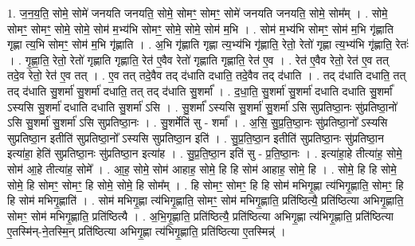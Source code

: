 \documentclass[17pt]{extarticle}
\begin{document}
1. ज॒न॒य॒ति॒ सोमे॒ सोमे॑ जनयति जनयति॒ सोमे॒ सोमꣳ॒॒ सोमꣳ॒॒ सोमे॑ जनयति जनयति॒ सोमे॒ सोम᳚म् । . सोमे॒ सोमꣳ॒॒ सोमꣳ॒॒ सोमे॒ सोमे॒ सोम॑ म॒भ्य॑भि सोमꣳ॒॒ सोमे॒ सोमे॒ सोम॑ म॒भि । . सोम॑ म॒भ्य॑भि सोमꣳ॒॒ सोम॑ म॒भि गृ॑ह्णाति गृह्णा त्य॒भि सोमꣳ॒॒ सोम॑ म॒भि गृ॑ह्णाति । . अ॒भि गृ॑ह्णाति गृह्णा त्य॒भ्य॑भि गृ॑ह्णाति॒ रेतो॒ रेतो॑ गृह्णा त्य॒भ्य॑भि गृ॑ह्णाति॒ रेतः॑ । . गृ॒ह्णा॒ति॒ रेतो॒ रेतो॑ गृह्णाति गृह्णाति॒ रेत॑ ए॒वैव रेतो॑ गृह्णाति गृह्णाति॒ रेत॑ ए॒व । . रेत॑ ए॒वैव रेतो॒ रेत॑ ए॒व तत् तदे॒व रेतो॒ रेत॑ ए॒व तत् । . ए॒व तत् तदे॒वैव तद् द॑धाति दधाति॒ तदे॒वैव तद् द॑धाति । . तद् द॑धाति दधाति॒ तत् तद् द॑धाति सु॒शर्मा॑ सु॒शर्मा॑ दधाति॒ तत् तद् द॑धाति सु॒शर्मा᳚ । . द॒धा॒ति॒ सु॒शर्मा॑ सु॒शर्मा॑ दधाति दधाति सु॒शर्मा᳚ ऽस्यसि सु॒शर्मा॑ दधाति दधाति सु॒शर्मा॑ ऽसि । . सु॒शर्मा᳚ ऽस्यसि सु॒शर्मा॑ सु॒शर्मा॑ ऽसि सुप्रतिष्ठा॒नः सु॑प्रतिष्ठा॒नो॑ ऽसि सु॒शर्मा॑ सु॒शर्मा॑ ऽसि सुप्रतिष्ठा॒नः । . सु॒शर्मेति॑ सु - शर्मा᳚ । . अ॒सि॒ सु॒प्र॒ति॒ष्ठा॒नः सु॑प्रतिष्ठा॒नो᳚ ऽस्यसि सुप्रतिष्ठा॒न इतीति॑ सुप्रतिष्ठा॒नो᳚ ऽस्यसि सुप्रतिष्ठा॒न इति॑ । . सु॒प्र॒ति॒ष्ठा॒न इतीति॑ सुप्रतिष्ठा॒नः सु॑प्रतिष्ठा॒न इत्या॑हा॒ हेति॑ सुप्रतिष्ठा॒नः सु॑प्रतिष्ठा॒न इत्या॑ह । . सु॒प्र॒ति॒ष्ठा॒न इति॑ सु - प्र॒ति॒ष्ठा॒नः । . इत्या॑हा॒हे तीत्या॑ह॒ सोमे॒ सोम॑ आ॒हे तीत्या॑ह॒ सोमे᳚ । . आ॒ह॒ सोमे॒ सोम॑ आहाह॒ सोमे॒ हि हि सोम॑ आहाह॒ सोमे॒ हि । . सोमे॒ हि हि सोमे॒ सोमे॒ हि सोमꣳ॒॒ सोमꣳ॒॒ हि सोमे॒ सोमे॒ हि सोम᳚म् । . हि सोमꣳ॒॒ सोमꣳ॒॒ हि हि सोम॑ मभिगृ॒ह्णा त्य॑भिगृ॒ह्णाति॒ सोमꣳ॒॒ हि हि सोम॑ मभिगृ॒ह्णाति॑ । . सोम॑ मभिगृ॒ह्णा त्य॑भिगृ॒ह्णाति॒ सोमꣳ॒॒ सोम॑ मभिगृ॒ह्णाति॒ प्रति॑ष्ठित्यै॒ प्रति॑ष्ठित्या अभिगृ॒ह्णाति॒ सोमꣳ॒॒ सोम॑ मभिगृ॒ह्णाति॒ प्रति॑ष्ठित्यै । . अ॒भि॒गृ॒ह्णाति॒ प्रति॑ष्ठित्यै॒ प्रति॑ष्ठित्या अभिगृ॒ह्णा त्य॑भिगृ॒ह्णाति॒ प्रति॑ष्ठित्या ए॒तस्मि॑न्-ने॒तस्मि॒न् प्रति॑ष्ठित्या अभिगृ॒ह्णा त्य॑भिगृ॒ह्णाति॒ प्रति॑ष्ठित्या ए॒तस्मिन्न्॑ । \newline
\end{document}

